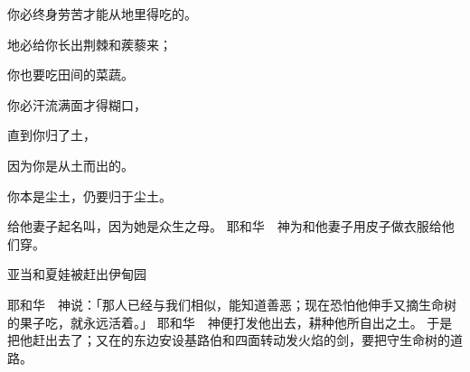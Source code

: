 {\par }{\Q 你必终身劳苦才能从地里得吃的。
\par }{\Q {}地必给你长出荆棘和蒺藜来；
\par }{\Q 你也要吃田间的菜蔬。
\par }{\Q {}你必汗流满面才得糊口，
\par }{\Q 直到你归了土，
\par }{\Q 因为你是从土而出的。
\par }{\Q 你本是尘土，仍要归于尘土。
\par }{\PP {}给他妻子起名叫{}，因为她是众生之母。
耶和华　神为{}和他妻子用皮子做衣服给他们穿。
\par }{\SH 亚当和夏娃被赶出伊甸园
\par }{\PP {}耶和华　神说：「那人已经与我们相似，能知道善恶；现在恐怕他伸手又摘生命树的果子吃，就永远活着。」
耶和华　神便打发他出{}去，耕种他所自出之土。
于是把他赶出去了；又在{}的东边安设基路伯和四面转动发火焰的剑，要把守生命树的道路。

}
